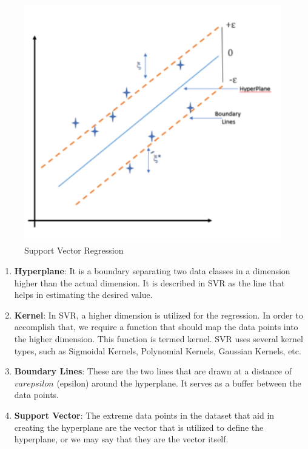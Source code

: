 \documentclass[a4paper,12pt]{report}%
\renewcommand{\\}{\vspace*{0.5\baselineskip} \newline}
\begin{document}
\begin{figure}[h]
\centering
	\includegraphics[scale=0.95]{images/svr.png}\\
	\begin{footnotesize}
		\caption{Support Vector Regression \cite{28}}
		\label{Support Vector Regression}
	\end{footnotesize}
\end{figure}

\begin{enumerate}
    \item \textbf{Hyperplane}: It is a boundary separating two data classes in a dimension higher than the actual dimension. It is described in SVR as the line that helps in estimating the desired value.
    
    \item \textbf{Kernel}: In SVR, a higher dimension is utilized for the regression. In order to accomplish that, we require a function that should map the data points into the higher dimension. This function is termed kernel. SVR uses several kernel types, such as Sigmoidal Kernels, Polynomial Kernels, Gaussian Kernels, etc.
    
    \item \textbf{Boundary Lines}: These are the two lines that are drawn at a distance of $varepsilon$ (epsilon) around the hyperplane. It serves as a buffer between the data points.
    
    \item \textbf{Support Vector}: The extreme data points in the dataset that aid in creating the hyperplane are the vector that is utilized to define the hyperplane, or we may say that they are the vector itself.
\end{enumerate}
\end{document}
